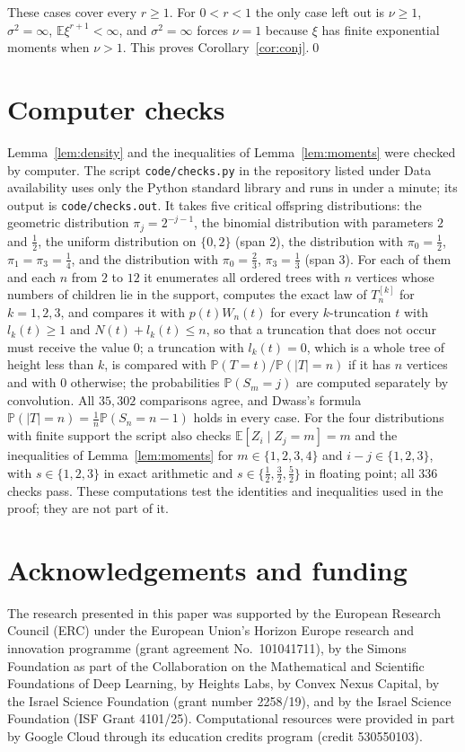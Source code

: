 \documentclass[11pt]{amsart}
\theoremstyle{remark}
\numberwithin{equation}{section}
\newcommand{\Pp}{\mathbb P}
\newcommand{\E}{\mathbb E}
\begin{document}
These cases cover every $r\ge1$. For $0<r<1$ the only case left out is $\nu\ge1$, $\sigma^2=\infty$, $\E\xi^{r+1}<\infty$, and $\sigma^2=\infty$ forces $\nu=1$ because $\xi$ has finite exponential moments when $\nu>1$. This proves Corollary~\ref{cor:conj}.\qed

\section{Computer checks}\label{sec:checks}

Lemma~\ref{lem:density} and the inequalities of Lemma~\ref{lem:moments} were checked by computer. The script \texttt{code/checks.py} in the repository listed under Data availability uses only the Python standard library and runs in under a minute; its output is \texttt{code/checks.out}. It takes five critical offspring distributions: the geometric distribution $\pi_j=2^{-j-1}$, the binomial distribution with parameters $2$ and $\frac12$, the uniform distribution on $\{0,2\}$ (span $2$), the distribution with $\pi_0=\frac12$, $\pi_1=\pi_3=\frac14$, and the distribution with $\pi_0=\frac23$, $\pi_3=\frac13$ (span $3$). For each of them and each $n$ from $2$ to $12$ it enumerates all ordered trees with $n$ vertices whose numbers of children lie in the support, computes the exact law of $T_n^{[k]}$ for $k=1,2,3$, and compares it with $p(t)W_n(t)$ for every $k$-truncation $t$ with $l_k(t)\ge1$ and $N(t)+l_k(t)\le n$, so that a truncation that does not occur must receive the value $0$; a truncation with $l_k(t)=0$, which is a whole tree of height less than $k$, is compared with $\Pp(T=t)/\Pp(|T|=n)$ if it has $n$ vertices and with $0$ otherwise; the probabilities $\Pp(S_m=j)$ are computed separately by convolution. All $35{,}302$ comparisons agree, and Dwass's formula $\Pp(|T|=n)=\frac1n\Pp(S_n=n-1)$ holds in every case. For the four distributions with finite support the script also checks $\E[Z_i\mid Z_j=m]=m$ and the inequalities of Lemma~\ref{lem:moments} for $m\in\{1,2,3,4\}$ and $i-j\in\{1,2,3\}$, with $s\in\{1,2,3\}$ in exact arithmetic and $s\in\{\frac12,\frac32,\frac52\}$ in floating point; all $336$ checks pass. These computations test the identities and inequalities used in the proof; they are not part of it.

\section*{Acknowledgements and funding}
The research presented in this paper was supported by the European Research
Council (ERC) under the European Union's Horizon Europe research and
innovation programme (grant agreement No.~101041711), by the Simons
Foundation as part of the Collaboration on the Mathematical and Scientific
Foundations of Deep Learning, by Heights Labs, by Convex Nexus Capital, by
the Israel Science Foundation (grant number 2258/19), and by the Israel
Science Foundation (ISF Grant 4101/25). Computational resources were
provided in part by Google Cloud through its education credits program
(credit 530550103).
\end{document}
